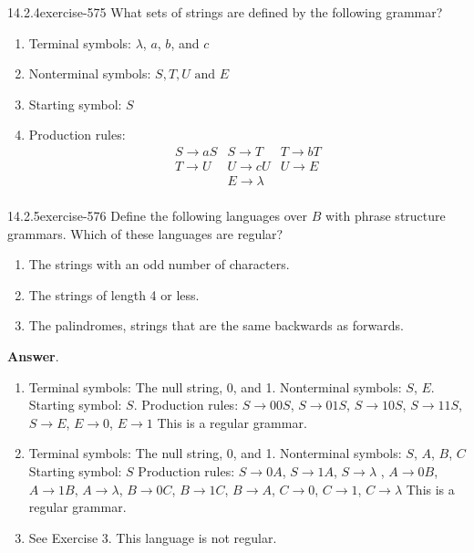 \documentclass[twoside,10pt,]{book}
\numberwithin{equation}{section}
\begin{document}
\begin{divisionsolution}{14.2.4}{}{exercise-575}%
\hypertarget{p-5180}{}%
What sets of strings are defined by the following grammar?\leavevmode%
\begin{enumerate}[label=(\alph*)]
\item\hypertarget{li-2358}{}\hypertarget{p-5181}{}%
Terminal symbols: \(\lambda\), \(a\), \(b\), and \(c\)%
\item\hypertarget{li-2359}{}\hypertarget{p-5182}{}%
Nonterminal symbols: \(S, T, U \textrm{ and } E\)%
\item\hypertarget{li-2360}{}\hypertarget{p-5183}{}%
Starting symbol: \(S\)%
\item\hypertarget{li-2361}{}\hypertarget{p-5184}{}%
Production rules:%
\begin{equation*}
\begin{array}{ccc}
S\to aS & S \to T & T\to bT\\
T\to U  & U \to cU & U \to E\\
& E\to \lambda &\\
\end{array}
\end{equation*}
%
\end{enumerate}
%
\end{divisionsolution}%
\begin{divisionsolution}{14.2.5}{}{exercise-576}%
\hypertarget{p-5185}{}%
Define the following languages over \(B\) with phrase structure grammars. Which of these languages are regular?\leavevmode%
\begin{enumerate}[label=(\alph*)]
\item\hypertarget{li-2362}{}\hypertarget{p-5186}{}%
The strings with an odd number of characters.%
\item\hypertarget{li-2363}{}\hypertarget{p-5187}{}%
The strings of length 4 or less.%
\item\hypertarget{li-2364}{}\hypertarget{p-5188}{}%
The palindromes, strings that are the same backwards as forwards.%
\end{enumerate}
%
\par\smallskip%
\noindent\textbf{Answer}.\quad%
\hypertarget{p-5189}{}%
\leavevmode%
\begin{enumerate}[label=(\alph*)]
\item\hypertarget{li-2365}{}\hypertarget{p-5190}{}%
Terminal symbols: The null string, 0, and 1. Nonterminal symbols: \(S\), \(E\). Starting symbol: \(S\). Production rules: \(S\to 00S\), \(S\to 01S\),  \(S\to 10S\),  \(S\to 11S\),  \(S\to E\),  \(E\to 0\),  \(E\to 1\) This is a regular grammar.%
\item\hypertarget{li-2366}{}\hypertarget{p-5191}{}%
Terminal symbols: The null string,  0,  and 1. Nonterminal symbols: \(S\), \(A\), \(B\), \(C\) Starting symbol: \(S\) Production rules: \(S \to  0A\), \(S \to  1A\), \(S \to  \lambda\) , \(A \to  0B\), \(A \to  1B\), \(A \to  \lambda\), \(B \to  0C\), \(B \to  1C\), \(B \to  A\), \(C \to  0\), \(C \to  1\), \(C \to  \lambda\) This is a regular grammar.%
\item\hypertarget{li-2367}{}\hypertarget{p-5192}{}%
See Exercise 3. This language is not regular.%
\end{enumerate}
%
\end{divisionsolution}%
\end{document}
